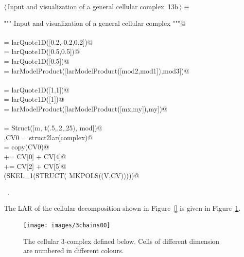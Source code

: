 \documentclass[11pt,oneside]{article}    %
\begin{document}
\begin{flushleft} \small \label{scrap23}
\protect{}$\langle\,$Input and visualization of a general cellular complex\nobreak\ {\footnotesize 13b}$\,\rangle\equiv$
\vspace{-1ex}
\begin{list}{}{} \item
\mbox{}\verb@""" Input and visualization of a general cellular complex """@\\
\mbox{}\verb@@\\
\mbox{} = larQuote1D([0.2,-0.2,0.2])@\\
\mbox{} = larQuote1D([0.5,0.5])@\\
\mbox{} = larQuote1D([0.5])@\\
\mbox{}\verb@mod = larModelProduct([larModelProduct([mod2,mod1]),mod3])@\\
\mbox{}\verb@@\\
\mbox{}\verb@mx = larQuote1D([1,1])@\\
\mbox{}\verb@my = larQuote1D([1])@\\
\mbox{}\verb@m = larModelProduct([larModelProduct([mx,my]),my])@\\
\mbox{}\verb@@\\
\mbox{}\verb@complex = Struct([m, t(.5,.2,.25), mod])@\\
\mbox{}\verb@V,CV0 = struct2lar(complex)@\\
\mbox{}\verb@CV = copy(CV0)@\\
\mbox{}\verb@CV[1] += CV[0] + CV[4]@\\
\mbox{}\verb@CV[3] += CV[2] + CV[5]@\\
\mbox{}\verb@VIEW(SKEL_1(STRUCT( MKPOLS((V,CV)))))@\\
\mbox{}\verb@@{\NWsep}
\end{list}
\vspace{-1ex}
\footnotesize\addtolength{\baselineskip}{-1ex}
\begin{list}{}{\setlength{\itemsep}{-\parsep}\setlength{\itemindent}{-\leftmargin}}
\item \NWtxtMacroRefIn\ .
\end{list}
\end{flushleft}

The LAR of the cellular decomposition shown in Figure~\ref{} is given in Figure~\ref{fig:3chains00}.
\begin{figure}[htbp] %
   \centering
   \texttt{[image: images/3chains00]} 
   \caption{The cellular 3-complex defined below. Cells of different dimension are numbered in different colours.}
   \label{fig:3chains00}
\end{figure}
\end{document}
